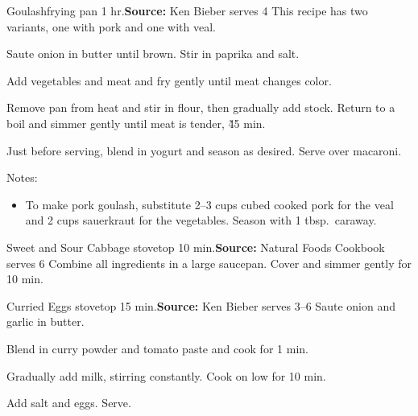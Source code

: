 \begin{recipe}{Goulash}{frying pan \hfill 1 hr.}{\textbf{Source:} Ken Bieber \hfill serves 4}
 \freeform [CB] This recipe has two variants, one with pork and one with veal.

 Saute onion in butter until brown. Stir in paprika and salt.

 Add vegetables and meat and fry gently until meat changes color.

 Remove pan from heat and stir in flour, then gradually add stock. Return to a boil and simmer gently until meat is tender, \~45 min.

 Just before serving, blend in yogurt and season as desired. Serve over macaroni.

 \freeform Notes:
 \begin{itemize}
  \item To make pork goulash, substitute 2--3 cups cubed cooked pork for the veal and 2 cups sauerkraut for the vegetables. Season with 1 tbsp.\ caraway.
 \end{itemize}
\end{recipe}

\begin{recipe}{Sweet and Sour Cabbage}{ \hfill stovetop \hfill 10 min.}{\textbf{Source:} Natural Foods Cookbook \hfill serves 6}
 Combine all ingredients in a large saucepan. Cover and simmer gently for 10 min.
\end{recipe}

\begin{recipe}{Curried Eggs}{ \hfill stovetop \hfill 15 min.}{\textbf{Source:} Ken Bieber \hfill serves 3--6}
 Saute onion and garlic in butter.

 Blend in curry powder and tomato paste and cook for 1 min.

 Gradually add milk, stirring constantly. Cook on low for 10 min.

 Add salt and eggs. Serve.
\end{recipe}

